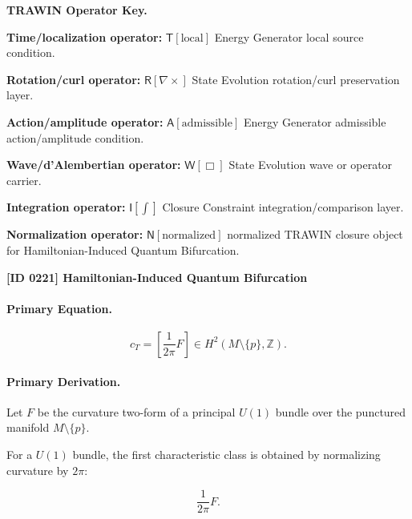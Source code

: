 \par\vspace{0.45\baselineskip}
\noindent\begin{minipage}[t]{\linewidth}
\begingroup
\small
\raggedright
\textbf{TRAWIN Operator Key.}\par
\noindent\textbf{Time/localization operator:} $\mathsf{T}\!\left[\mathrm{local}\right]$ Energy Generator local source condition.\par
\noindent\textbf{Rotation/curl operator:} $\mathsf{R}\!\left[\nabla\times\right]$ State Evolution rotation/curl preservation layer.\par
\noindent\textbf{Action/amplitude operator:} $\mathsf{A}\!\left[\mathrm{admissible}\right]$ Energy Generator admissible action/amplitude condition.\par
\noindent\textbf{Wave/d'Alembertian operator:} $\mathsf{W}\!\left[\Box\right]$ State Evolution wave or operator carrier.\par
\noindent\textbf{Integration operator:} $\mathsf{I}\!\left[\int\right]$ Closure Constraint integration/comparison layer.\par
\noindent\textbf{Normalization operator:} $\mathsf{N}\!\left[\mathrm{normalized}\right]$ normalized TRAWIN closure object for Hamiltonian-Induced Quantum Bifurcation.\par
\endgroup
\end{minipage}

\clearpage
\noindent\textbf{[ID 0221] Hamiltonian-Induced Quantum Bifurcation}\par
\vspace{0.35em}
\paragraph{Primary Equation.}
\begin{equation}
c_T
=
\left[
\frac{1}{2\pi}F
\right]
\in
H^2(M\setminus\{p\},\mathbb{Z}) .
\end{equation}

\paragraph{Primary Derivation.}
Let $F$ be the curvature two-form of a principal $U(1)$ bundle over the punctured manifold $M\setminus\{p\}$.

For a $U(1)$ bundle, the first characteristic class is obtained by normalizing curvature by $2\pi$:

\begin{equation}
\frac{1}{2\pi}F .
\end{equation}


